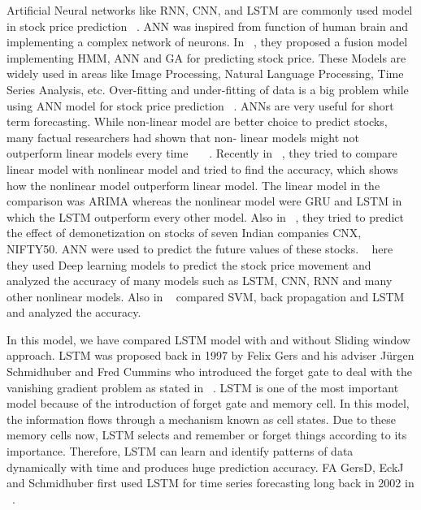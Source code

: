 \documentclass[5p,,preprint,12pt,twocolumn]{elsarticle}
\begin{document}
Artificial Neural networks like RNN, CNN, and LSTM are commonly used model in stock price prediction \unskip~\cite{490201:11043807}. ANN was inspired from function of human brain and implementing a complex network of neurons.  In \unskip~\cite{490201:11043808}, they proposed a fusion model implementing HMM, ANN and GA for predicting stock price. These Models are widely used in areas like Image Processing, Natural Language Processing, Time Series Analysis, etc. Over-fitting and under-fitting of data is a big problem while using ANN model for stock price prediction \unskip~\cite{490201:11043809}. ANNs are very useful for short term forecasting. While non-linear model are better choice to predict stocks, many factual researchers had shown that non- linear models might not outperform linear models every time \unskip~\cite{490201:11043810}\unskip~\cite{490201:11043811}\unskip~\cite{490201:11043812}. Recently in \unskip~\cite{490201:11043813}, they tried to compare linear model with nonlinear model and tried to find the accuracy, which shows how the nonlinear model outperform linear model. The linear model in the comparison was ARIMA whereas the nonlinear model were GRU and LSTM in which the LSTM outperform every other model. Also in \unskip~\cite{490201:11043814}, they tried to predict the effect of demonetization on stocks of seven Indian companies CNX, NIFTY50. ANN were used to predict the future values of these stocks. \unskip~\cite{490201:11043815}  here they used Deep learning models to predict the stock price movement and analyzed the accuracy of many models such as LSTM, CNN, RNN and many other nonlinear models. Also in \unskip~\cite{490201:11043816}  compared SVM, back propagation and LSTM and analyzed the accuracy.

In this model, we have compared LSTM model with and without Sliding window approach. LSTM was proposed back in 1997 by Felix Gers and his adviser J{\"{u}}rgen Schmidhuber and Fred Cummins who introduced the forget gate to deal with the vanishing gradient problem as stated in \unskip~\cite{490201:11043817}. LSTM is one of the most important model because of the introduction of forget gate and memory cell. In this model, the information flows through a mechanism known as cell states. Due to these memory cells now, LSTM selects and remember or forget things according to its importance. Therefore, LSTM can learn and identify patterns of data dynamically with time and produces huge prediction accuracy.  FA GersD, EckJ and Schmidhuber first used LSTM for time series forecasting long back in 2002 in \unskip~\cite{490201:11043818}.
    
\end{document}
